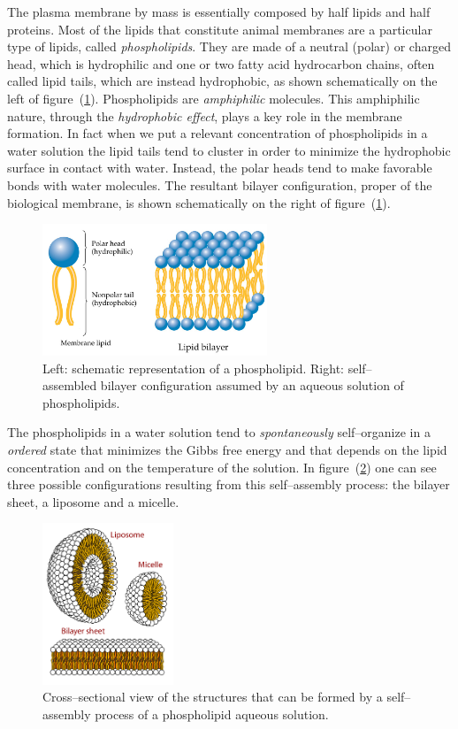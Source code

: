The plasma membrane by mass is essentially composed by half lipids and half proteins. Most of the lipids that 
constitute animal membranes are a particular type of lipids, called \textit{phospholipids}. They are made of a 
neutral (polar) or charged head, which is hydrophilic and one or two fatty acid hydrocarbon chains, often called 
lipid tails, which are instead hydrophobic, as shown schematically on the left of figure~(\ref{fig:phospho}).  
Phospholipids are \textit{amphiphilic} molecules. This amphiphilic nature, through the \textit{hydrophobic 
effect}, plays a key role in the membrane formation. In fact when we put a relevant concentration of phospholipids 
in a water solution the lipid tails tend to cluster in order to minimize the hydrophobic surface in contact with 
water. Instead, the polar heads tend to make favorable bonds with water molecules. The resultant bilayer 
configuration, proper of the biological membrane, is shown schematically on the right of 
figure~(\ref{fig:phospho}).
\begin{figure}[!ht]
	\centering
	\includegraphics[width=0.6\textwidth]{./img/phospholipids}
	\caption{Left: schematic representation of a phospholipid. Right: self--assembled bilayer configuration assumed by an aqueous solution of phospholipids.}%
	\label{fig:phospho}
\end{figure}
The phospholipids in a water solution tend to \textit{spontaneously} self--organize in a \textit{ordered} state 
that minimizes the Gibbs free energy and that depends on the lipid concentration and on the temperature of the 
solution. In figure~(\ref{fig:lipidsStructures}) one can see three possible configurations resulting from this 
self--assembly process: the bilayer sheet, a liposome and a micelle.
\begin{figure}
	\centering
	\includegraphics[width=0.35\textwidth]{./img/lipidsStructures}
	\caption{Cross--sectional view of the structures that can be formed by a self--assembly process of a phospholipid aqueous solution.}%
	\label{fig:lipidsStructures}
\end{figure}

